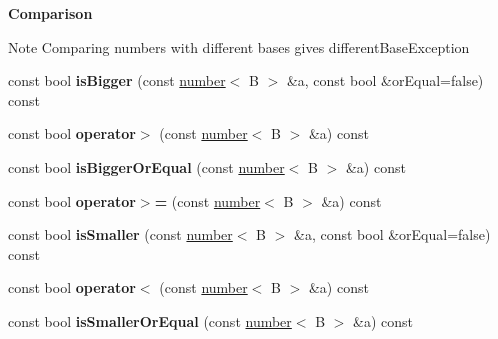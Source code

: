 \begin{Indent}{\bf Comparison}\par
{\em \begin{DoxyNote}{Note}
Comparing numbers with different bases gives different\-Base\-Exception 
\end{DoxyNote}
}\begin{DoxyCompactItemize}
\item 
\hypertarget{classcjr_1_1number_a16ba1ce1e338fce48151a39ded8b7474}{const bool {\bfseries is\-Bigger} (const \hyperlink{classcjr_1_1number}{number}$<$ B $>$ \&a, const bool \&or\-Equal=false) const }\label{classcjr_1_1number_a16ba1ce1e338fce48151a39ded8b7474}

\item 
\hypertarget{classcjr_1_1number_a1f8bdacbaf1f13628d0d05c0bc2d216a}{const bool {\bfseries operator$>$} (const \hyperlink{classcjr_1_1number}{number}$<$ B $>$ \&a) const }\label{classcjr_1_1number_a1f8bdacbaf1f13628d0d05c0bc2d216a}

\item 
\hypertarget{classcjr_1_1number_a409317d22923aec056b3278e844d1211}{const bool {\bfseries is\-Bigger\-Or\-Equal} (const \hyperlink{classcjr_1_1number}{number}$<$ B $>$ \&a) const }\label{classcjr_1_1number_a409317d22923aec056b3278e844d1211}

\item 
\hypertarget{classcjr_1_1number_a920c71c3a23745c99b5f80cb789cd028}{const bool {\bfseries operator$>$=} (const \hyperlink{classcjr_1_1number}{number}$<$ B $>$ \&a) const }\label{classcjr_1_1number_a920c71c3a23745c99b5f80cb789cd028}

\item 
\hypertarget{classcjr_1_1number_a5cf22a07813460edd061753af8089ca4}{const bool {\bfseries is\-Smaller} (const \hyperlink{classcjr_1_1number}{number}$<$ B $>$ \&a, const bool \&or\-Equal=false) const }\label{classcjr_1_1number_a5cf22a07813460edd061753af8089ca4}

\item 
\hypertarget{classcjr_1_1number_ab3595677812bf4fc5a19e3a7929a91da}{const bool {\bfseries operator$<$} (const \hyperlink{classcjr_1_1number}{number}$<$ B $>$ \&a) const }\label{classcjr_1_1number_ab3595677812bf4fc5a19e3a7929a91da}

\item 
\hypertarget{classcjr_1_1number_a5933f01885bea73d89cf31cc45e61d23}{const bool {\bfseries is\-Smaller\-Or\-Equal} (const \hyperlink{classcjr_1_1number}{number}$<$ B $>$ \&a) const }\label{classcjr_1_1number_a5933f01885bea73d89cf31cc45e61d23}


\end{DoxyCompactItemize}
\end{Indent}
